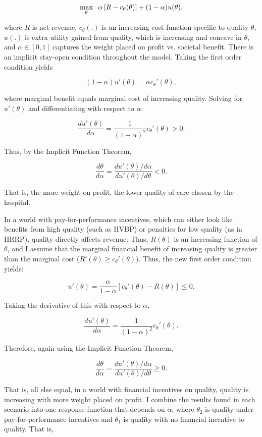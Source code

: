 \documentclass[12pt]{article}
\begin{document}
    $$\max_{\theta}\hspace{2mm}\alpha\left[R - c_{\theta}(\theta) \right] + (1-\alpha) u(\theta),$$

    \noindent where $R$ is net revenue, $c_{\theta}(.)$ is an increasing cost function specific to quality $\theta$, $u(.)$ is extra utility gained from quality, which is increasing and concave in $\theta$, and $\alpha\in[0,1]$ captures the weight placed on profit vs. societal benefit. There is an implicit stay-open condition throughout the model. Taking the first order condition yields 

    $$(1-\alpha)u'(\theta) = \alpha c_{\theta}'(\theta),$$

    \noindent where marginal benefit equals marginal cost of increasing quality. Solving for $u'(\theta)$ and differentiating with respect to $\alpha$:

    $$\frac{du'(\theta)}{d\alpha} = \frac{1}{(1-\alpha)^2}c_{\theta}'(\theta) > 0.$$

    \noindent Thus, by the Implicit Function Theorem, 

    $$\frac{d\theta}{d\alpha} = \frac{du'(\theta)/d\alpha}{du'(\theta)/d\theta} < 0.$$

    \noindent That is, the more weight on profit, the lower quality of care chosen by the hospital.

    In a world with pay-for-performance incentives, which can either look like benefits from high quality (such as HVBP) or penalties for low quality (as in HRRP), quality directly affects revenue. Thus, $R(\theta)$ is an increasing function of $\theta$, and I assume that the marginal financial benefit of increasing quality is greater than the marginal cost ($R'(\theta)\geq c_{\theta}'(\theta))$. Thus, the new first order condition yields:

    $$u'(\theta) = \frac{\alpha}{1-\alpha} \left[c_{\theta}'(\theta)-R(\theta)\right] \leq 0.$$

    \noindent Taking the derivative of this with respect to $\alpha$,

    $$\frac{du'(\theta)}{d\alpha} = \frac{1}{(1-\alpha)^2}c_{\theta}'(\theta).$$

    Therefore, again using the Implicit Function Theorem,

    $$\frac{d\theta}{d\alpha} = \frac{du'(\theta)/d\alpha}{du'(\theta)/d\theta}\geq0.$$

    That is, all else equal, in a world with financial incentives on quality, quality is increasing with more weight placed on profit. I combine the results found in each scenario into one response function that depends on $\alpha$, where $\theta_2$ is quality under pay-for-performance incentives and $\theta_1$ is quality with no financial incentive to quality. That is, 
\end{document}
